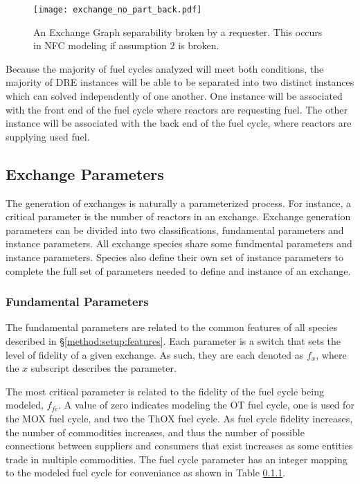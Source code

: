 \begin{figure}
  \begin{center}
    \texttt{[image: exchange\_no\_part\_back.pdf]}
    \caption[]{
      \label{fig:no_part_back}
      An Exchange Graph separability broken by a requester. This occurs in NFC
      modeling if assumption $2$ is broken.}
  \end{center}
\end{figure}

Because the majority of fuel cycles analyzed will meet both conditions, the
majority of DRE instances will be able to be separated into two distinct
instances which can solved independently of one another. One instance will be
associated with the front end of the fuel cycle where reactors are requesting
fuel. The other instance will be associated with the back end of the fuel cycle,
where reactors are supplying used fuel.

\subsection{Exchange Parameters}\label{method:setup:params}

The generation of exchanges is naturally a parameterized process. For instance,
a critical parameter is the number of reactors in an exchange. Exchange
generation parameters can be divided into two classifications, fundamental
parameters and instance parameters. All exchange species share some fundmental
parameters and instance parameters. Species also define their own set of
instance parameters to complete the full set of parameters needed to define and
instance of an exchange.

\subsubsection{Fundamental Parameters}

The fundamental parameters are related to the common features of all species
described in \S \ref{method:setup:features}. Each parameter is a switch that
sets the level of fidelity of a given exchange. As such, they are each denoted
as $f_x$, where the $x$ subscript describes the parameter.

The most critical parameter is related to the fidelity of the fuel cycle being
modeled, $f_{fc}$. A value of zero indicates modeling the OT fuel cycle, one is
used for the MOX fuel cycle, and two the ThOX fuel cycle. As fuel cycle fidelity
increases, the number of commodities increases, and thus the number of possible
connections between suppliers and consumers that exist increases as some
entities trade in multiple commodities. The fuel cycle parameter has an integer
mapping to the modeled fuel cycle for conveniance as shown in Table \ref{}.

